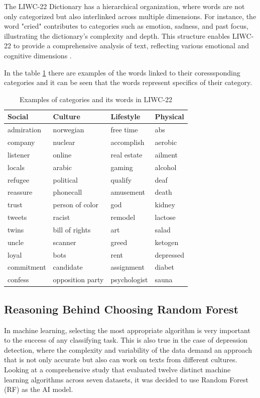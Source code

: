 \documentclass[3p,times,procedia]{elsarticle}
\begin{document}
The LIWC-22 Dictionary has a hierarchical organization, where words are not only categorized but also interlinked across multiple dimensions. For instance, the word "cried" contributes to categories such as emotion, sadness, and past focus, illustrating the dictionary's complexity and depth. This structure enables LIWC-22 to provide a comprehensive analysis of text, reflecting various emotional and cognitive dimensions \cite{boyd2022development}.

In the table \ref{examplesLIWC22Dic} there are examples of the words linked to their coresssponding categories and it can be seen that the words represent specifics of their category. 

\begin{table}[ht]
\centering
\begin{tabular}{llll}
\hline
\textbf{Social} & \textbf{Culture} & \textbf{Lifestyle} & \textbf{Physical} \\ \hline
admiration & norwegian & free time & abs \\
company & nuclear & accomplish & aerobic\\
listener & online & real estate & ailment\\
locals & arabic & gaming & alcohol\\
refugee & political & qualify & deaf\\
reassure & phonecall & amusement &  death\\
trust & person of color & god &  kidney\\
tweets & racist &  remodel &  lactose\\
twins & bill of rights & art & salad\\
uncle & scanner & greed & ketogen\\
loyal & bots & rent &  depressed\\
commitment & candidate & assignment &  diabet\\
confess & opposition party & psychologist & sauna\\ \hline
\end{tabular}
\caption{Examples of categories and its words in LIWC-22}
\label{examplesLIWC22Dic}
\end{table}

\subsection{Reasoning Behind Choosing Random Forest}

In machine learning, selecting the most appropriate algorithm is very important to the success of any classifying task. This is also true in the case of depression detection, where the complexity and variability of the data demand an approach that is not only accurate but also can work on texts from different cultures. Looking at a  comprehensive study that evaluated twelve distinct machine learning algorithms across seven datasets\cite{siraj2023performanceModelComparison}, it was decided to use Random Forest (RF) as the AI model.
\end{document}
